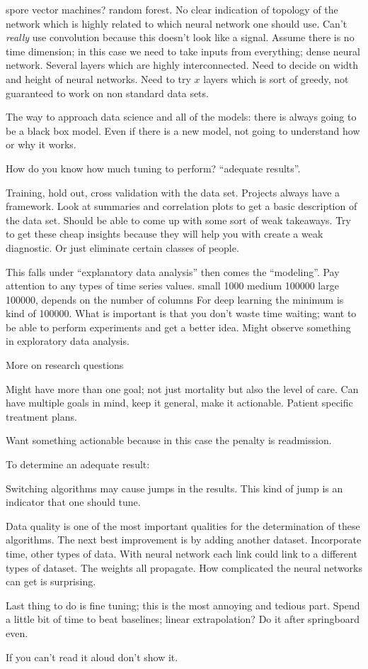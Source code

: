 spore vector machines? random forest. No clear
indication of topology of the network which
is highly related to which neural network one
should use. Can't \textit{really} use convolution because this doesn't look like a signal. Assume there is no time dimension; in this case we need to take inputs from everything; dense neural network. Several layers
which are highly interconnected. Need to decide on width and height of neural networks. Need to try $x$ layers which is sort of greedy, not
guaranteed to work on non standard data sets. 

The way to approach data science and all of the
models: there is always going to be a black box model. Even if there is a new model, not going to understand how or why it works.

How do you know how much tuning to perform? ``adequate results''. 

Training, hold out, cross validation with the
data set. Projects always have a framework. Look
at summaries and correlation plots to get a
basic description of the data set. Should be able to come up with some sort of weak takeaways. Try to get these cheap insights because they will help you with create a weak
diagnostic. Or just eliminate certain classes of people. 

This falls under ``explanatory data analysis''
then comes the ``modeling''. Pay attention to
any types of time series values. 
small 1000
medium 100000
large 100000, depends on the number of columns
For deep learning the minimum is kind of 100000. 
What is important is that you don't waste time waiting; want to be able to perform experiments
and get a better idea. 
Might observe something in exploratory data analysis.  

More on research questions

Might have more than one goal; not just mortality but also the level of care. 
Can have multiple goals in mind, keep it
general, make it actionable. Patient specific
treatment plans.

Want something actionable because in this case
the penalty is readmission. 

To determine an adequate result:

Switching algorithms may cause jumps in the results. This kind of jump is an indicator that
one should tune.

Data quality is one of the most important qualities for the determination of these algorithms. The next best improvement is by
adding another dataset. Incorporate time, other
types of data. With neural network each link could link to a different types of dataset. The
weights all propagate. How complicated the neural networks can get is surprising.

Last thing to do is fine tuning; this is the most annoying and tedious part. Spend a little
bit of time to beat baselines; linear extrapolation? Do it after springboard even. 

If you can't read it aloud don't show it. 